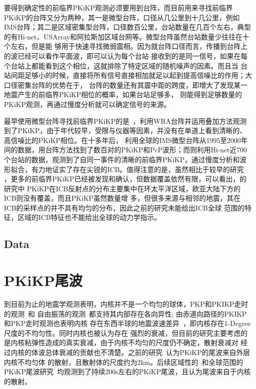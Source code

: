 要得到确定性的前临界PKiKP观测必须要用到台阵，而目前用来寻找前临界PKiKP的台阵又分为两种，其一是微型台阵，口径从几公里到十几公里，例如IMS台阵；其二是区域密集型台阵，口径数百公里，台站数量在几百个左右，典型的有Hi-net、USArray和阿拉斯加区域台网等。微型台阵虽然台站数量少往往在十个左右，但是能
够用于快速寻找微弱震相。因为就台阵口径而言，传播到台阵上的波已经可以看作平面波，即可以认为每个台站
接收到的是同一信号，如果在每个台站上都能看到这个相位，这就排除了特定区域的随机噪声的因素。而且当
台站间距足够小的时候，直接将所有信号直接相加就足以起到提高信噪比的作用；大口径密集台阵的优势在于， 台阵的数量还有其震中距的跨度，即增大了发现某一地震产生的前临界PKiKP相位的概率，如果台站足够多，
则能得到足够数量的PKiKP观测，再通过慢度分析就可以确定信号的来源。

最早使用微型台阵寻找前临界PKiKP的是~\cite{Souriau1989}，利用WRA台阵并运用叠加方法观测到了PKiKP，由于年代较早，受限与仪器等因素，并没有在单道上看到清晰的、高信噪比的PKiKP相位。在十多年后，
\cite{Koper2003}利用全球的IMS微型台阵从1995至2000年间的数据，用台阵方法找到了数百对的PKiKP和PcP波形；而\cite{Kawakatsu2006}则利用Hi-net近700个台站的数据，观测到了自同一事件的清晰的前临界PKiKP，通过慢度分析和波形拟合，有力地证实了存在尖锐的ICB。值得注意的是，虽然相比于较早的研究
，更多的前临界PKiKP已经被发现和确认，但数据覆盖依然有限，可以看出，\cite{Koper2003}的研究中
PKiKP在ICB反射点的分布主要集中在环太平洋区域，欧亚大陆下方的ICB则没有覆盖，而且PKiKP虽然数量增
多，但很多来源与相邻的地震，其在ICB的采样点的并不具有均匀的分布，因此之前的研究未能给出ICB全球
范围的特征，区域的ICB特征也不能给出全球的动力学指示。

\subsection{Data}



\newpage

\section{PKiKP尾波}


到目前为止的地震学观测表明，内核并不是一个均匀的球体，PKP和PKIKP走时的观测~\citep{Creager1992}和
自由振荡的观测~\citep{Tromp1993}都支持其内部存在各向异性; 由赤道向路径的PKIKP和PKP走时观测也表明内核
存在东西半球的地震波速差异~\citep{Tanaka1997}，即内核存在1-Degree尺度的不均匀性。同时内核也被认为存在
强烈的衰减，但目前的研究主要考虑的是内核粘弹性造成的真实衰减，由于内核不均匀的尺度仍不确定，散射衰减对
经过内核的体波总体衰减的贡献也不清楚。之前的研究~\citep{Vidale2000}认为PKiKP的尾波来自外层内核不均匀体
的散射，且散射体的尺度约为2km。后续区域性的~\citep{Poupinet2004}和全球范围的PKiKP尾波研究~\citep{Koper2004}均观测到了持续200s左右的PKiKP尾波，且认为尾波来自于内核的散射。

